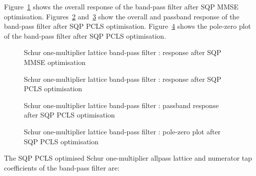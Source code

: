 \documentclass[a4paper,twoside,10pt,english]{report}
\begin{document}
Figure~\ref{fig:Schur-one-multiplier-lattice-band-pass-filter-SQP-MMSE} 
shows the overall response of the band-pass filter after SQP MMSE optimisation.
Figures~\ref{fig:Schur-one-multiplier-lattice-band-pass-filter-SQP-PCLS} 
and~\ref{fig:Schur-one-multiplier-lattice-band-pass-filter-SQP-PCLS-pass} 
show the overall and passband response of the band-pass filter after SQP PCLS
optimisation.
Figure~\ref{fig:Schur-one-multiplier-lattice-band-pass-filter-SQP-PCLS-pz} shows
the pole-zero plot of the band-pass filter after SQP PCLS optimisation.

\begin{figure}[!htbp]
\begin{center}
\scalebox{0.7}{}
\caption{Schur one-multiplier lattice band-pass filter : response after SQP MMSE optimisation}
\label{fig:Schur-one-multiplier-lattice-band-pass-filter-SQP-MMSE}
\end{center}
\end{figure}
\begin{figure}[!htbp]
\begin{center}
\scalebox{0.7}{}
\caption{Schur one-multiplier lattice band-pass filter : response after SQP PCLS optimisation}
\label{fig:Schur-one-multiplier-lattice-band-pass-filter-SQP-PCLS}
\end{center}
\end{figure}
\begin{figure}[!htbp]
\begin{center}
\scalebox{0.7}{}
\caption{Schur one-multiplier lattice band-pass filter : passband response after SQP PCLS optimisation}
\label{fig:Schur-one-multiplier-lattice-band-pass-filter-SQP-PCLS-pass}
\end{center}
\end{figure}
\begin{figure}[!htbp]
\begin{center}
\scalebox{0.7}{}
\caption{Schur one-multiplier lattice band-pass filter : pole-zero plot after SQP PCLS optimisation}
\label{fig:Schur-one-multiplier-lattice-band-pass-filter-SQP-PCLS-pz}
\end{center}
\end{figure}

The SQP PCLS optimised Schur one-multiplier allpass lattice and numerator tap 
coefficients of the band-pass filter are:
\begin{small}




\end{small}
\end{document}
